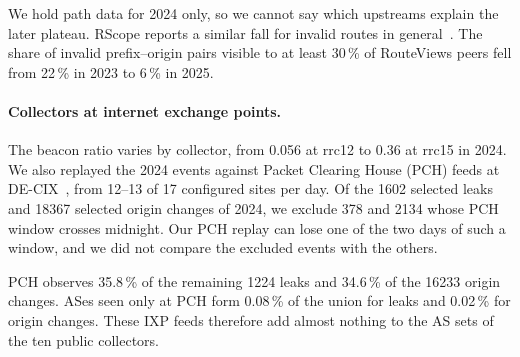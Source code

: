 We hold path data for 2024 only, so we cannot say which upstreams explain the later plateau.
RScope reports a similar fall for invalid routes in general~\cite{li2026rscope}.
The share of invalid prefix--origin pairs visible to at least 30\,\% of RouteViews peers fell from 22\,\% in 2023 to 6\,\% in 2025.

\paragraph{Collectors at internet exchange points.}
The beacon ratio varies by collector, from 0.056 at rrc12 to 0.36 at rrc15 in 2024.
We also replayed the 2024 events against Packet Clearing House (PCH) feeds at DE-CIX~\cite{pch_mrt}, from 12--13 of 17 configured sites per day.
Of the \num{1602} selected leaks and \num{18367} selected origin changes of 2024, we exclude 378 and \num{2134} whose PCH window crosses midnight.
Our PCH replay can lose one of the two days of such a window, and we did not compare the excluded events with the others.

PCH observes 35.8\,\% of the remaining \num{1224} leaks and 34.6\,\% of the \num{16233} origin changes.
ASes seen only at PCH form 0.08\,\% of the union for leaks and 0.02\,\% for origin changes.
These IXP feeds therefore add almost nothing to the AS sets of the ten public collectors.
